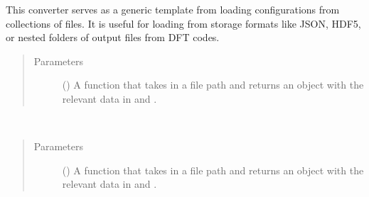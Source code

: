 \documentclass[letterpaper,10pt,english]{sphinxmanual}
\begin{document}

\begin{fulllineitems}
\label{\detokenize{converters:colabfit.tools.converters.FolderConverter}}
\sphinxAtStartPar
This converter serves as a generic template from loading configurations from
collections of files. It is useful for loading from storage formats like
JSON, HDF5, or nested folders of output files from DFT codes.
\begin{quote}\begin{description}
\item[{Parameters}] \leavevmode
\sphinxAtStartPar
{} () \textendash{} A function that takes in a file path and returns an 
object with the relevant data in  and
.

\end{description}\end{quote}

\begin{fulllineitems}
\label{\detokenize{converters:colabfit.tools.converters.FolderConverter.__init__}}~\begin{quote}\begin{description}
\item[{Parameters}] \leavevmode
\sphinxAtStartPar
{} () \textendash{} A function that takes in a file path and returns an 
object with the relevant data in  and
.

\end{description}\end{quote}

\end{fulllineitems}


\end{fulllineitems}
\end{document}
